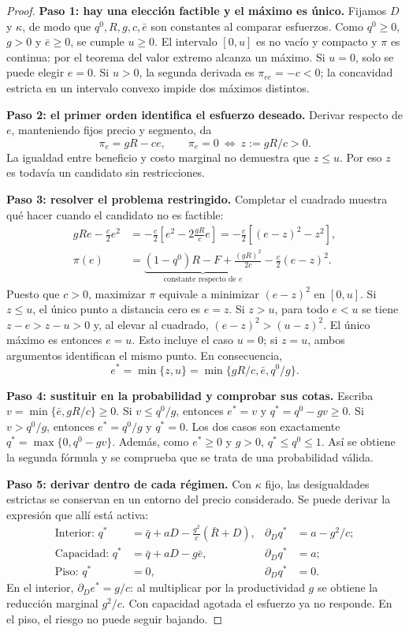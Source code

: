\documentclass[11pt]{article}
\theoremstyle{definition}\newtheorem{assumption}{Supuesto}
\begin{document}
\begin{proof}
\textbf{Paso 1: hay una elección factible y el máximo es único.}
Fijamos $D$ y $\kappa$, de modo que $q^0,R,g,c,\bar e$ son constantes al
comparar esfuerzos. Como $q^0\ge0$, $g>0$ y $\bar e\ge0$, se cumple $u\ge0$.
El intervalo $[0,u]$ es no vacío y compacto y $\pi$ es continua: por el teorema
del valor extremo alcanza un máximo. Si $u=0$, solo se puede elegir $e=0$.
Si $u>0$, la segunda derivada es $\pi_{ee}=-c<0$; la concavidad estricta en
un intervalo convexo impide dos máximos distintos.

\textbf{Paso 2: el primer orden identifica el esfuerzo deseado.}
Derivar respecto de $e$, manteniendo fijos precio y segmento, da
\[
\pi_e=gR-ce,\qquad \pi_e=0\ \Longleftrightarrow\ z:=gR/c>0.
\]
La igualdad entre beneficio y costo marginal no demuestra que $z\le u$.
Por eso $z$ es todavía un candidato sin restricciones.

\textbf{Paso 3: resolver el problema restringido.}
Completar el cuadrado muestra qué hacer cuando el candidato no es factible:
\begin{align*}
gRe-\frac c2e^2
 &=-\frac c2\left[e^2-2\frac{gR}{c}e\right]
  =-\frac c2\left[(e-z)^2-z^2\right],\\
\pi(e)&=\underbrace{(1-q^0)R-F+\frac{(gR)^2}{2c}}_{\text{constante respecto de }e}
              -\frac c2(e-z)^2.
\end{align*}
Puesto que $c>0$, maximizar $\pi$ equivale a minimizar $(e-z)^2$ en $[0,u]$.
Si $z\le u$, el único punto a distancia cero es $e=z$. Si $z>u$, para todo
$e<u$ se tiene $z-e>z-u>0$ y, al elevar al cuadrado,
$(e-z)^2>(u-z)^2$. El único máximo es entonces $e=u$. Esto incluye el caso
$u=0$; si $z=u$, ambos argumentos identifican el mismo punto. En consecuencia,
\[
e^*=\min\{z,u\}=\min\{gR/c,\bar e,q^0/g\}.
\]

\textbf{Paso 4: sustituir en la probabilidad y comprobar sus cotas.}
Escriba $v=\min\{\bar e,gR/c\}\ge0$. Si $v\le q^0/g$, entonces $e^*=v$ y
$q^*=q^0-gv\ge0$. Si $v>q^0/g$, entonces $e^*=q^0/g$ y $q^*=0$. Los dos
casos son exactamente $q^*=\max\{0,q^0-gv\}$. Además, como $e^*\ge0$ y
$g>0$, $q^*\le q^0\le1$. Así se obtiene la segunda fórmula y se comprueba
que se trata de una probabilidad válida.

\textbf{Paso 5: derivar dentro de cada régimen.}
Con $\kappa$ fijo, las desigualdades estrictas se conservan en un entorno
del precio considerado. Se puede derivar la expresión que allí está activa:
\begin{align*}
\text{Interior: }q^*&=\bar q+aD-\frac{g^2}{c}(\bar R+D),
 &\partial_Dq^*&=a-g^2/c;\\
\text{Capacidad: }q^*&=\bar q+aD-g\bar e,
 &\partial_Dq^*&=a;\\
\text{Piso: }q^*&=0,
 &\partial_Dq^*&=0.
\end{align*}
En el interior, $\partial_De^*=g/c$: al multiplicar por la productividad $g$
se obtiene la reducción marginal $g^2/c$. Con capacidad agotada el esfuerzo
ya no responde. En el piso, el riesgo no puede seguir bajando.


\end{proof}
\end{document}
